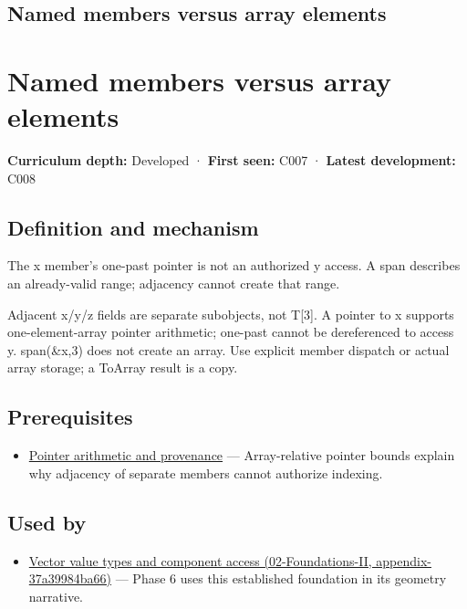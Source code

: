 \hypertarget{appendix-3f7e15effba6}{}
\section*{Named members versus array elements}
\chapter{Named members versus array elements}\label{appendix-3f7e15effba6-named-members-versus-array-elements}

\textbf{Curriculum depth:} Developed · \textbf{First seen:} C007 · \textbf{Latest development:} C008

\section{Definition and mechanism}\label{appendix-3f7e15effba6-definition-and-mechanism}

The x member's one-past pointer is not an authorized y access. A span describes an already-valid range; adjacency cannot create that range.

Adjacent x/y/z fields are separate subobjects, not T{[}3{]}. A pointer to x supports one-element-array pointer arithmetic; one-past cannot be dereferenced to access y. span(\&x,3) does not create an array. Use explicit member dispatch or actual array storage; a ToArray result is a copy.

\section{Prerequisites}\label{appendix-3f7e15effba6-prerequisites}

\begin{itemize}
\tightlist
\item
  \hyperref[appendix-6af5921bc853]{Pointer arithmetic and provenance} --- Array-relative pointer bounds explain why adjacency of separate members cannot authorize indexing.
\end{itemize}

\section{Used by}\label{appendix-3f7e15effba6-used-by}

\begin{itemize}
\tightlist
\item
  \href{../02-Foundations-II/main.pdf\#nameddest=appendix-37a39984ba66}{Vector value types and component access (02-Foundations-II, appendix-37a39984ba66)} --- Phase 6 uses this established foundation in its geometry narrative.
\end{itemize}

